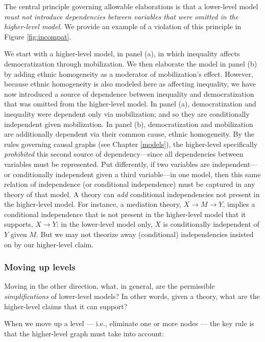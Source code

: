 \documentclass[12pt,]{book}
\begin{document}
The central principle governing allowable elaborations is that a lower-level model \emph{must not introduce dependencies between variables that were omitted in the higher-level model.} We provide an example of a violation of this principle in Figure \ref{fig:incompat}.

We start with a higher-level model, in panel (a), in which inequality affects democratization through mobilization. We then elaborate the model in panel (b) by adding ethnic homogeneity as a moderator of mobilization's effect. However, because ethnic homogeneity is also modeled here as affecting inequality, we have now introduced a source of dependence between inequality and democratization that was omitted from the higher-level model. In panel (a), democratization and inequality were dependent only via mobilization; and so they are conditionally independent given mobilization. In panel (b), democratization and mobilization are additionally dependent via their common cause, ethnic homogeneity. By the rules governing causal graphs (see Chapter \ref{models}), the higher-level specifically \emph{prohibited} this second source of dependency---since all dependencies between variables must be represented.
Put differently, if two variables are independent--- or conditionally independent given a third variable---in one model, then this same relation of independence (or conditional independence) must be captured in any theory of that model. A theory can \emph{add} conditional independencies not present in the higher-level model. For instance, a mediation theory, \(X \rightarrow M \rightarrow Y\), implies a conditional independence that is not present in the higher-level model that it supports, \(X \rightarrow Y\): in the lower-level model only, \(X\) is conditionally independent of \(Y\) given \(M\). But we may not theorize away (conditional) independencies insisted on by our higher-level claim.

\hypertarget{moving-up-levels}{%
\subsubsection{Moving up levels}\label{moving-up-levels}}

Moving in the other direction, what, in general, are the permissible \emph{simplifications} of lower-level models? In other words, given a theory, what are the higher-level claims that it can support?

When we move up a level --- i.e., eliminate one or more nodes --- the key rule is that the higher-level graph must take into account:
\end{document}
